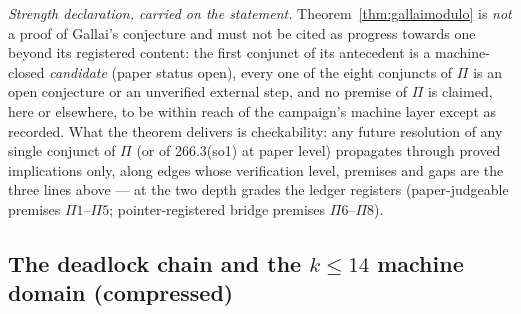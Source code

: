 \emph{Strength declaration, carried on the statement.} Theorem~\ref{thm:gallaimodulo} is
\emph{not} a proof of Gallai's conjecture and must not be cited as progress towards one
beyond its registered content: the first conjunct of its antecedent is a machine-closed
\emph{candidate} (paper status open), every one of the eight conjuncts of $\Pi$ is an open
conjecture or an unverified external step, and no premise of $\Pi$ is claimed, here or
elsewhere, to be within reach of the campaign's machine layer except as recorded. What the
theorem delivers is checkability: any future resolution of any single conjunct of $\Pi$ (or of
266.3(so1) at paper level) propagates through proved implications only, along edges whose
verification level, premises and gaps are the three lines above --- at the two depth grades the
ledger registers (paper-judgeable premises $\Pi1$--$\Pi5$; pointer-registered bridge premises
$\Pi6$--$\Pi8$).

\subsection{The deadlock chain and the $k\le14$ machine domain
(compressed)}\label{subsec:deadlock}

